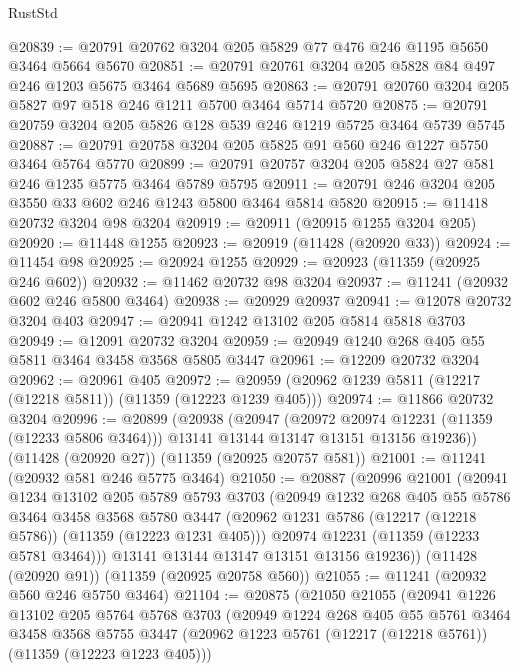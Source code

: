 \begin{lexlean}{RustStd}
\begin{coremodule}
{{{{{{{{{{{{{{{{{{{@20839 := @20791 @20762 @3204 @205 @5829 @77 @476 @246 @1195 @5650 @3464 @5664 @5670
@20851 := @20791 @20761 @3204 @205 @5828 @84 @497 @246 @1203 @5675 @3464 @5689 @5695
@20863 := @20791 @20760 @3204 @205 @5827 @97 @518 @246 @1211 @5700 @3464 @5714 @5720
@20875 := @20791 @20759 @3204 @205 @5826 @128 @539 @246 @1219 @5725 @3464 @5739 @5745
@20887 := @20791 @20758 @3204 @205 @5825 @91 @560 @246 @1227 @5750 @3464 @5764 @5770
@20899 := @20791 @20757 @3204 @205 @5824 @27 @581 @246 @1235 @5775 @3464 @5789 @5795
@20911 := @20791 @246 @3204 @205 @3550 @33 @602 @246 @1243 @5800 @3464 @5814 @5820
@20915 := @11418 @20732 @3204 @98 @3204
@20919 := @20911 (@20915 @1255 @3204 @205)
@20920 := @11448 @1255
@20923 := @20919 (@11428 (@20920 @33))
@20924 := @11454 @98
@20925 := @20924 @1255
@20929 := @20923 (@11359 (@20925 @246 @602))
@20932 := @11462 @20732 @98 @3204
@20937 := @11241 (@20932 @602 @246 @5800 @3464)
@20938 := @20929 @20937
@20941 := @12078 @20732 @3204 @403
@20947 := @20941 @1242 @13102 @205 @5814 @5818 @3703
@20949 := @12091 @20732 @3204
@20959 := @20949 @1240 @268 @405 @55 @5811 @3464 @3458 @3568 @5805 @3447
@20961 := @12209 @20732 @3204
@20962 := @20961 @405
@20972 := @20959 (@20962 @1239 @5811 (@12217 (@12218 @5811)) (@11359 (@12223 @1239 @405)))
@20974 := @11866 @20732 @3204
@20996 := @20899
    (@20938
      (@20947
        (@20972 @20974 @12231 (@11359 (@12233 @5806 @3464)))
        @13141
        @13144
        @13147
        @13151
        @13156
        @19236))
    (@11428 (@20920 @27))
    (@11359 (@20925 @20757 @581))
@21001 := @11241 (@20932 @581 @246 @5775 @3464)
@21050 := @20887
    (@20996
      @21001
      (@20941
        @1234
        @13102
        @205
        @5789
        @5793
        @3703
        (@20949
          @1232
          @268
          @405
          @55
          @5786
          @3464
          @3458
          @3568
          @5780
          @3447
          (@20962 @1231 @5786 (@12217 (@12218 @5786)) (@11359 (@12223 @1231 @405)))
          @20974
          @12231
          (@11359 (@12233 @5781 @3464)))
        @13141
        @13144
        @13147
        @13151
        @13156
        @19236))
    (@11428 (@20920 @91))
    (@11359 (@20925 @20758 @560))
@21055 := @11241 (@20932 @560 @246 @5750 @3464)
@21104 := @20875
    (@21050
      @21055
      (@20941
        @1226
        @13102
        @205
        @5764
        @5768
        @3703
        (@20949
          @1224
          @268
          @405
          @55
          @5761
          @3464
          @3458
          @3568
          @5755
          @3447
          (@20962 @1223 @5761 (@12217 (@12218 @5761)) (@11359 (@12223 @1223 @405)))
}}}}}}}}}}}}}}}}}}}
\end{coremodule}
\end{lexlean}
